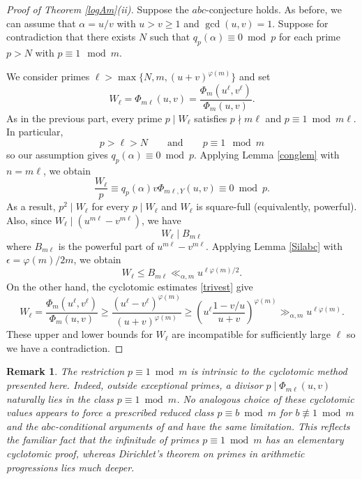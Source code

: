 \documentclass[10pt,a4paper]{amsart}
\newtheorem{remark}[theorem]{\bf Remark}
\begin{document}
\begin{proof}[Proof of Theorem \ref{logAm}(ii)]
Suppose the $abc$-conjecture holds. 
As before, we can assume that $\alpha=u/v$ with $u>v\geq 1$ and $\gcd(u,v)=1$. 
Suppose for contradiction that there exists $N$ such that $q_p(\alpha)\equiv 0\bmod p$ for each prime $p>N$ with $p\equiv 1\mod m$. 
\medskip

We consider primes $\ell>\max\{N,m,(u+v)^{\varphi(m)}\}$ and set 
\[W_\ell=\Phi_{m\ell}(u,v)=\frac{\Phi_m(u^\ell,v^\ell)}{\Phi_m(u,v)}.\] 
As in the previous part, every prime $p\mid W_\ell$ satisfies $p\nmid m\ell$ and $p\equiv 1\bmod m\ell$. In particular, 
\[p>\ell>N\qquad\text{and}\qquad p\equiv 1\mod m\]
so our assumption gives $q_p(\alpha)\equiv 0\bmod p$. Applying Lemma \ref{conglem} with $n=m\ell$, we obtain
\[\frac{W_\ell}{p}\equiv q_p(\alpha)v\Phi_{m\ell,Y}(u,v)\equiv 0\bmod p.\]
As a result, $p^2\mid W_\ell$ for every $p\mid W_\ell$ and $W_\ell$ is square-full (equivalently, powerful). 
Also, since $W_\ell\mid \left(u^{m\ell}-v^{m\ell}\right)$, we have 
\[W_\ell\mid B_{m\ell}\]
where $B_{m\ell}$ is the powerful part of $u^{m\ell}-v^{m\ell}$. Applying Lemma \ref{Silabc} with $\epsilon=\varphi(m)/2m$, we obtain
\[W_\ell\leq B_{m\ell}\ll_{\alpha,m}u^{\ell\varphi(m)/2}.\]
On the other hand, the cyclotomic estimates \eqref{trivest} give
\[W_\ell=\frac{\Phi_m(u^\ell,v^\ell)}{\Phi_m(u,v)}
\geq \frac{(u^\ell-v^\ell)^{\varphi(m)}}{(u+v)^{\varphi(m)}}
\geq \left(u^\ell\frac{1-v/u}{u+v}\right)^{\varphi(m)}
\gg_{\alpha,m} u^{\ell\varphi(m)}.\]
These upper and lower bounds for $W_\ell$ are incompatible for sufficiently large $\ell$ so we have a contradiction.
\end{proof}
\begin{remark}
The restriction $p\equiv 1\bmod m$ is intrinsic to the cyclotomic method presented here. 
Indeed, outside exceptional primes, a divisor $p\mid\Phi_{m\ell}(u,v)$ naturally lies in the class $p\equiv 1 \bmod m$. No analogous choice of these cyclotomic values appears to force a prescribed reduced class $p\equiv b\bmod m$ for $b\not\equiv 1\bmod m$ and the $abc$-conditional arguments of \cite{GRM13} and \cite{D19} have the same limitation. This reflects the familiar fact that the infinitude of primes $p\equiv 1\bmod m$ has an elementary cyclotomic proof, whereas Dirichlet's theorem on primes in arithmetic progressions lies much deeper.
\end{remark}
\end{document}
